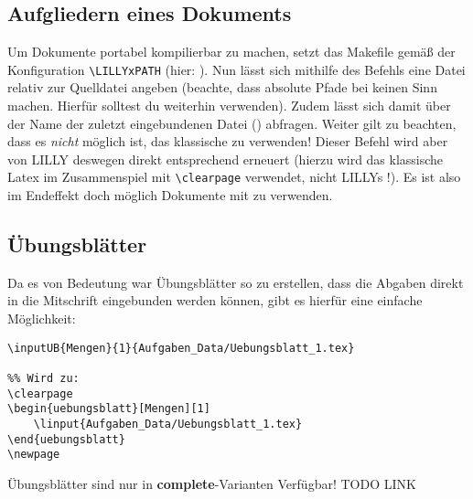\subsection{Aufgliedern eines Dokuments}
Um Dokumente portabel kompilierbar zu machen, setzt das Makefile gemäß der Konfiguration \verb|\LILLYxPATH| (hier: \say{\T{\LILLYxPATH}}). Nun lässt sich mithilfe des Befehls  eine Datei relativ zur Quelldatei angeben (beachte, dass absolute Pfade bei  keinen Sinn machen. Hierfür solltest du weiterhin \verb|| verwenden).\newline
Zudem lässt sich damit über  der Name der zuletzt eingebundenen Datei (\T{\LILLYxDOCUMENTxSUBNAME}) abfragen.\newline
{}Weiter gilt zu beachten, dass es \emph{nicht} möglich ist, das klassische \verb|| zu verwenden! Dieser Befehl wird aber von LILLY deswegen direkt entsprechend erneuert (hierzu wird das klassische Latex \verb|| im Zusammenspiel mit \verb|\clearpage| verwendet, nicht LILLYs !). Es ist also im Endeffekt doch möglich Dokumente mit \verb||
zu verwenden.





\subsection{Übungsblätter}
Da es von Bedeutung war Übungsblätter so zu erstellen, dass die Abgaben direkt in die Mitschrift eingebunden werden können, gibt es hierfür eine einfache Möglichkeit:
\begin{lstlisting}[language=lLatex]
%% \inputUB{<Name>}{<Nummer>}{<Pfad - linput>}
\inputUB{Mengen}{1}{Aufgaben_Data/Uebungsblatt_1.tex}

%% Wird zu:
\clearpage
\begin{uebungsblatt}[Mengen][1]
    \linput{Aufgaben_Data/Uebungsblatt_1.tex}
\end{uebungsblatt}
\newpage
\end{lstlisting}
Übungsblätter sind nur in \textbf{complete}-Varianten Verfügbar! TODO LINK


\clearpage
